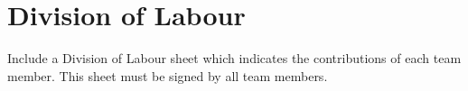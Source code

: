 \documentclass[]{article}
\begin{document}


\appendix
\section{Division of Labour}
\label{sec:division_of_labour}
Include a Division of Labour sheet which indicates the contributions of each team member. This sheet must be signed by all team members.

\end{document}
